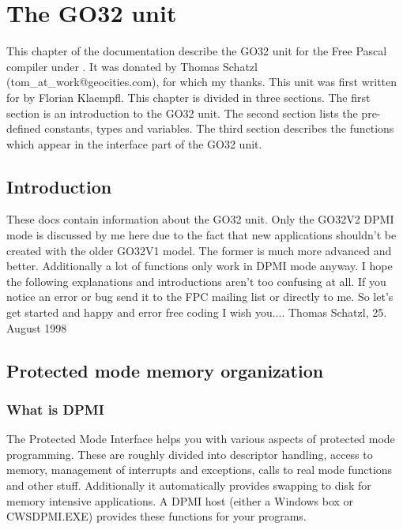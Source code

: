 \chapter{The GO32 unit}
This chapter of the documentation describe the GO32 unit for the Free Pascal
compiler under \dos. It was donated by Thomas Schatzl
(tom\_at\_work@geocities.com), for which my thanks.
This unit was first written for \dos by Florian Klaempfl.
This chapter is divided in three sections. The first section is an
introduction to the GO32 unit. The second section lists the pre-defined
constants, types and variables. The third section describes the functions
which appear in the interface part of the GO32 unit.
\section{Introduction}
These docs contain information about the GO32 unit. Only the GO32V2 DPMI
mode is discussed by me here due to the fact that new applications shouldn't
be created with the older GO32V1 model. The former is much more advanced and
better. Additionally a lot of functions only work in DPMI mode anyway.
I hope the following explanations and introductions aren't too confusing at
all. If you notice an error or bug send it to the FPC mailing list or
directly to me.
So let's get started and happy and error free coding I wish you....
\hfill Thomas Schatzl, 25. August 1998
\section{Protected mode memory organization}
\subsection{What is DPMI}
The \dos Protected Mode Interface helps you with various aspects of protected
mode programming. These are roughly divided into descriptor handling, access
to \dos memory, management of interrupts and exceptions, calls to real mode
functions and other stuff. Additionally it automatically provides swapping
to disk for memory intensive applications.
A DPMI host (either a Windows \dos box or CWSDPMI.EXE) provides these
functions for your programs.
